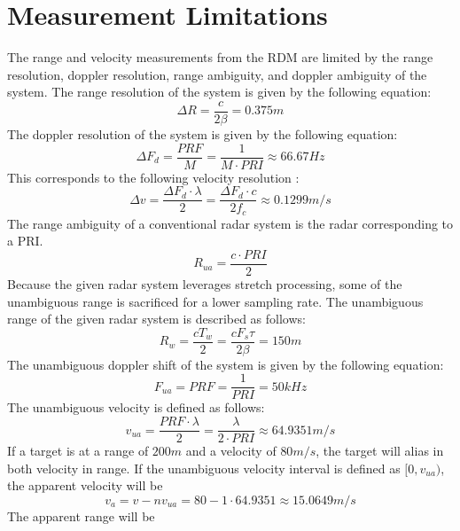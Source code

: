 \documentclass[conference]{IEEEtran}
\begin{document}
\section{Measurement Limitations}
The range and velocity measurements from the RDM are limited by the range resolution, doppler resolution, range ambiguity, and doppler ambiguity of the system. The range resolution of the system is given by the following equation:
\begin{equation}
\Delta R = \frac{c}{2\beta} = 0.375m
\end{equation}
The doppler resolution of the system is given by the following equation:
\begin{equation}
\Delta F_d = \frac{PRF}{M} = \frac{1}{M\cdot PRI} \approx 66.67Hz
\end{equation}
This corresponds to the following velocity resolution :
\begin{equation}
\Delta v = \frac{\Delta F_d \cdot \lambda}{2} = \frac{\Delta F_d \cdot c}{2f_c} \approx 0.1299 m/s
\end{equation}
The range ambiguity of a conventional radar system is the radar corresponding to a PRI. 
\begin{equation}
R_{ua} = \frac{c \cdot PRI}{2} 
\end{equation}
Because the given radar system leverages stretch processing, some of the unambiguous range is sacrificed for a lower sampling rate. The unambiguous range of the given radar system is described as follows:
\begin{equation}
\label{Rw CPI0}
R_w = \frac{c T_w}{2} = \frac{c F_s \tau}{2\beta} = 150m
\end{equation}
The unambiguous doppler shift of the system is given by the following equation:
\begin{equation}
F_{ua} = PRF = \frac{1}{PRI} = 50kHz
\end{equation}
The unambiguous velocity is defined as follows:
\begin{equation}
\label{vua CPI0}
v_{ua} = \frac{PRF\cdot\lambda}{2} = \frac{\lambda}{2\cdot PRI} \approx 64.9351m/s 
\end{equation}
If a target is at a range of $200m$ and a velocity of $80m/s$, the target will alias in both velocity in range. If the unambiguous velocity interval is defined as $[0, v_{ua})$, the apparent velocity will be
\begin{equation}
v_a = v - nv_{ua} = 80 - 1 \cdot 64.9351 \approx 15.0649m/s
\end{equation}
The apparent range will be
\end{document}
